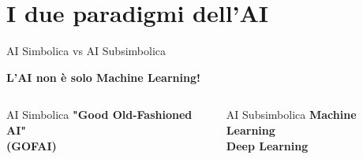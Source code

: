 \documentclass[aspectratio=169,12pt]{beamer}
\begin{document}
\section{I due paradigmi dell'AI}
%
%
\begin{frame}{AI Simbolica vs AI Subsimbolica}
    \begin{center}
        \textbf{L'AI non è solo Machine Learning!}
    \end{center}
    
    \vspace{0.5cm}
    
    \begin{columns}
        \begin{column}{0.5\textwidth}
            \begin{block}{\centering AI Simbolica}
                \centering
                \textbf{"Good Old-Fashioned AI"}\\
                \textbf{(GOFAI)}
            \end{block}
        \end{column}
        \begin{column}{0.5\textwidth}
            \begin{block}{\centering AI Subsimbolica}
                \centering
                \textbf{Machine Learning}\\
                \textbf{Deep Learning}
            \end{block}
        \end{column}
    \end{columns}
    
    \vspace{0.5cm}
    
    \begin{center}
    \end{center}
\end{frame}
%
%
\end{document}
